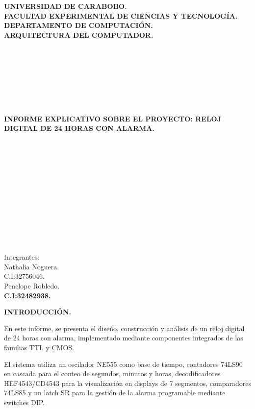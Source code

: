 \documentclass[12pt,letterpaper]{article}
\begin{document}
\begin{center}
\textbf{UNIVERSIDAD DE CARABOBO.}\\
\textbf{FACULTAD EXPERIMENTAL DE CIENCIAS Y TECNOLOGÍA.}\\
\textbf{DEPARTAMENTO DE COMPUTACIÓN.}\\
\textbf{ARQUITECTURA DEL COMPUTADOR.}
\end{center}

\vspace{2cm}

\begin{center}
\textbf{\\}
\textbf{\\}
\textbf{\\}
\textbf{\\}
\textbf{\\}
\textbf{\\}
\textbf{\\INFORME EXPLICATIVO SOBRE EL PROYECTO: RELOJ DIGITAL DE 24 HORAS CON ALARMA.}
\end{center}
\textbf{\\}
\textbf{\\}
\textbf{\\}
\textbf{\\}
\textbf{\\}
\textbf{\\}

\vspace{1cm}

\begin{flushright}
\\\\\\\\\\Integrantes:\\
Nathalia Noguera.\\
C.I:32756046.\\
Penelope Robledo.\\
\textbf{C.I:32482938.}
\end{flushright}

\pagebreak

\textbf{INTRODUCCIÓN.}

\indent En este informe, se presenta el diseño, construcción y análisis de un reloj digital de 24 horas con alarma, implementado mediante componentes integrados de las familias TTL y CMOS.

\indent El sistema utiliza un oscilador NE555 como base de tiempo, contadores 74LS90 en cascada para el conteo de segundos, minutos y horas, decodificadores HEF4543/CD4543 para la visualización en displays de 7 segmentos, comparadores 74LS85 y un latch SR para la gestión de la alarma programable mediante switches DIP. 
\end{document}
